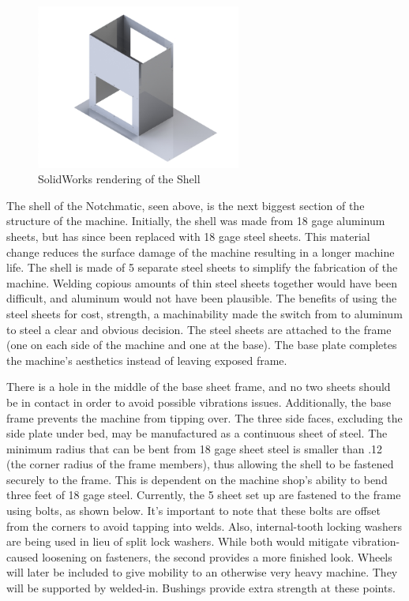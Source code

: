 \newpage

\begin{figure}[H]
    \centering
    \includegraphics[width=0.6\textwidth]{./images/Chapter2-MachineDescription/Shell}
    \caption{SolidWorks rendering of the Shell}
    \label{fig:Shell}
\end{figure}

The shell of the Notchmatic, seen above, is the next biggest section of the structure of the machine. Initially, the shell was made from 18 gage aluminum sheets, but has since been replaced with 18 gage steel sheets. This material change reduces the surface damage of the machine resulting in a longer machine life. The shell is made of 5 separate steel sheets to simplify the fabrication of the machine. Welding copious amounts of thin steel sheets together would have been difficult, and aluminum would not have been plausible. The benefits of using the steel sheets for cost, strength, a machinability made the switch from to aluminum to steel a clear and obvious decision. The steel sheets are attached to the frame (one on each side of the machine and one at the base). The base plate completes the machine's aesthetics instead of leaving exposed frame.
 
There is a hole in the middle of the base sheet frame, and no two sheets should be in contact in order to avoid possible vibrations issues. Additionally, the base frame prevents the machine from tipping over. The three side faces, excluding the side plate under bed, may be manufactured as a continuous sheet of steel. The minimum radius that can be bent from 18 gage sheet steel is smaller than .12 (the corner radius of the frame members), thus allowing the shell to be fastened securely to the frame. This is dependent on the machine shop's ability to bend three feet of 18 gage steel. Currently, the 5 sheet set up are fastened to the frame using bolts, as shown below. It's important to note that these bolts are offset from the corners to avoid tapping into welds. Also, internal-tooth locking washers are being used in lieu of split lock washers. While both would mitigate vibration-caused loosening on fasteners, the second provides a more finished look. Wheels will later be included to give mobility to an otherwise very heavy machine. They will be supported by welded-in. Bushings provide extra strength at these points.


